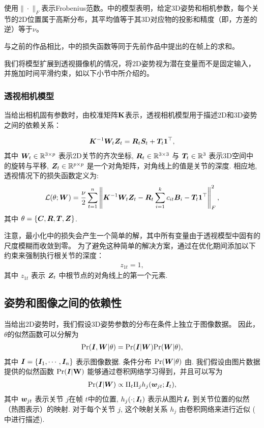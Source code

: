 使用$\|\cdot\|_F$表示Frobenius范数。中的模型表明，给定3D姿势和相机参数，每个关节的2D位置属于高斯分布，其平均值等于其3D对应物的投影和精度（即，方差的逆）等于$\nu$。

与之前的作品相比\cite{zhou2015sparse}，中的损失函数等同于先前作品中提出的\cite{zhou2015sparse}在帧上的求和。

我们将模型扩展到透视摄像机的情况，将2D姿势视为潜在变量而不是固定输入，并施加时间平滑约束，如以下小节中所介绍的。

\subsubsection{透视相机模型}

当给出相机固有参数时，由校准矩阵$\bf K$表示，透视相机模型用于描述2D和3D姿势之间的依赖关系：

\begin{align}\label{eq:model-fp}
    {\bm{K}}^{-1}{\bm{W}}_t{\bm{Z}}_t = {\bm{R}}_t{\bm{S}}_t + {\bm{T}}_t{\bm{1}}^\top,
\end{align}
其中 ${\bm{W}}_t\in\mathbb{R}^{3 \times p}$ 表示2D关节的齐次坐标, ${\bm{R}}_t\in\mathbb{R}^{3 \times 3}$ 与 ${\bm{T}}_t\in\mathbb{R}^{3}$ 表示3D空间中的旋转与平移, ${\bm{Z}}_t\in\mathbb{R}^{p \times p}$ 是一个对角矩阵，对角线上的值是关节的深度. 相应地, 透视情况下的损失函数定义为:
\begin{align}\label{eq:loss-fp}\small
\mathcal{L}(\theta;{\bm{W}}) = \frac{\nu}{2}\sum_{t=1}^{n}\left\|{\bm{K}}^{-1}{\bm{W}}_t{\bm{Z}}_t - {\bm{R}}_t\sum_{i=1}^{k} c_{it}{\bm{B}}_i - {\bm{T}}_t{\bm{1}}^\top\right\|_F^2,
\end{align}
其中 $\theta=\{{\bm{C}},{\bm{R}},{\bm{T}},{\bm{Z}}\}$.

注意，最小化中的损失会产生一个简单的解，其中所有变量由于透视模型中固有的尺度模糊而收敛到零。 为了避免这种简单的解决方案，通过在优化期间添加以下约束来强制执行根关节的深度：
\begin{align}
z_{1t}=1,
\end{align}
其中 $z_{1t}$ 表示 ${\bm{Z}}_t$ 中根节点的对角线上的第一个元素.

\subsection{姿势和图像之间的依赖性}

当给出2D姿势时，我们假设3D姿势参数的分布在条件上独立于图像数据。 因此，$\theta$的似然函数可以分解为
\begin{align}\label{eq:likelihood-complete}
\mbox{Pr}({\bm{I}},{\bm{W}}|\theta) = \mbox{Pr}({\bm{I}}|{\bm{W}})\mbox{Pr}({\bm{W}}|\theta),
\end{align}
其中 ${\bm{I}}=\{{\bm{I}}_1,\cdots,{\bm{I}}_n\}$ 表示图像数据. 条件分布 $\mbox{Pr}({\bm{W}}|\theta)$ 由. 我们假设由图片数据提供的似然函数 $\mbox{Pr}({\bm{I}}|\bf W)$ 能够通过卷积网络学习得到，并且可以写为
\begin{align}\label{eq:pr-I-W}
\mbox{Pr}({\bm{I}}|{\bm{W}}) \propto \Pi_{t}\Pi_{j}h_j({\bm{w}}_{jt};{\bm{I}}_t),
\end{align}
其中 ${\bm{w}}_{jt}$ 表示关节 $j$在帧 $t$中的位置, $h_j(\cdot;{\bm{I}}_t)$ 表示从图片${\bm{I}}_t$ 到关节位置的似然（热图表示）的映射.
对于每个关节 $j$, 这个映射关系 $h_j$ 由卷积网络来进行近似 (  中进行描述).

